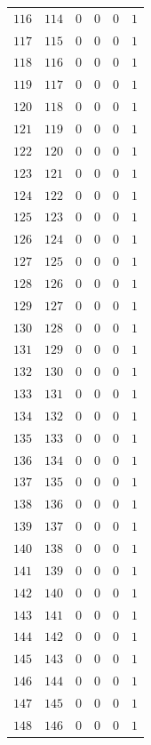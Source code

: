 {\begin{longtable}{@{}r r r r r c@{}}
\(116\) & \(114\) & 0 & 0 & 0 & \(1\) \\
\(117\) & \(115\) & 0 & 0 & 0 & \(1\) \\
\(118\) & \(116\) & 0 & 0 & 0 & \(1\) \\
\(119\) & \(117\) & 0 & 0 & 0 & \(1\) \\
\(120\) & \(118\) & 0 & 0 & 0 & \(1\) \\
\(121\) & \(119\) & 0 & 0 & 0 & \(1\) \\
\(122\) & \(120\) & 0 & 0 & 0 & \(1\) \\
\(123\) & \(121\) & 0 & 0 & 0 & \(1\) \\
\(124\) & \(122\) & 0 & 0 & 0 & \(1\) \\
\(125\) & \(123\) & 0 & 0 & 0 & \(1\) \\
\(126\) & \(124\) & 0 & 0 & 0 & \(1\) \\
\(127\) & \(125\) & 0 & 0 & 0 & \(1\) \\
\(128\) & \(126\) & 0 & 0 & 0 & \(1\) \\
\(129\) & \(127\) & 0 & 0 & 0 & \(1\) \\
\(130\) & \(128\) & 0 & 0 & 0 & \(1\) \\
\(131\) & \(129\) & 0 & 0 & 0 & \(1\) \\
\(132\) & \(130\) & 0 & 0 & 0 & \(1\) \\
\(133\) & \(131\) & 0 & 0 & 0 & \(1\) \\
\(134\) & \(132\) & 0 & 0 & 0 & \(1\) \\
\(135\) & \(133\) & 0 & 0 & 0 & \(1\) \\
\(136\) & \(134\) & 0 & 0 & 0 & \(1\) \\
\(137\) & \(135\) & 0 & 0 & 0 & \(1\) \\
\(138\) & \(136\) & 0 & 0 & 0 & \(1\) \\
\(139\) & \(137\) & 0 & 0 & 0 & \(1\) \\
\(140\) & \(138\) & 0 & 0 & 0 & \(1\) \\
\(141\) & \(139\) & 0 & 0 & 0 & \(1\) \\
\(142\) & \(140\) & 0 & 0 & 0 & \(1\) \\
\(143\) & \(141\) & 0 & 0 & 0 & \(1\) \\
\(144\) & \(142\) & 0 & 0 & 0 & \(1\) \\
\(145\) & \(143\) & 0 & 0 & 0 & \(1\) \\
\(146\) & \(144\) & 0 & 0 & 0 & \(1\) \\
\(147\) & \(145\) & 0 & 0 & 0 & \(1\) \\
\(148\) & \(146\) & 0 & 0 & 0 & \(1\) \\

\end{longtable}}
